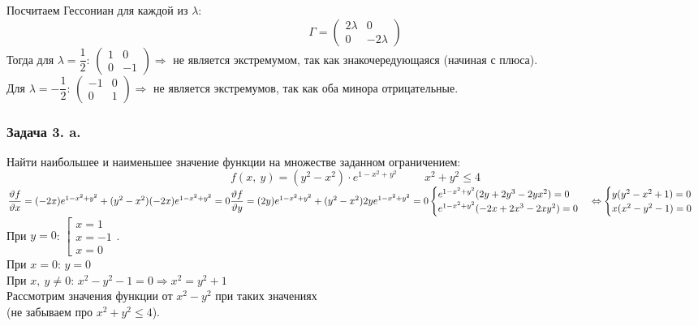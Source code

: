 \documentclass[12pt, letterpaper, twoside]{article}
\begin{document}
Посчитаем Гессониан для каждой из $\lambda$:
\[\Gamma = \begin{pmatrix}
    2\lambda & 0\\
    0 & -2\lambda
\end{pmatrix}\]
Тогда для $\lambda = \dfrac{1}{2}$: $\begin{pmatrix}
    1 & 0\\
    0 & -1
\end{pmatrix}\Rightarrow$ не является экстремумом, так как знакочередующаяся (начиная с плюса).\\
Для $\lambda = -\dfrac{1}{2}$: $\begin{pmatrix}
    -1 & 0\\
    0 & 1
\end{pmatrix}\Rightarrow$ не является экстремумов, так как оба минора отрицательные.
\subsubsection*{Задача 3. a.}
Найти наибольшее и наименьшее значение функции на множестве заданном ограничением:
\[f(x,\ y) = (y^2 - x^2)\cdot e^{1 - x^2 + y^2}\hspace{1cm} x^2 + y^2 \leq 4\]
$\dfrac{\vartheta f}{\vartheta x} = (-2x)e^{1 - x^2 + y^2} + (y^2 - x^2)(-2x)e^{1 - x^2 + y^2} = 0\\
\dfrac{\vartheta f}{\vartheta y} = (2y)e^{1 - x^2 + y^2} + (y^2 - x^2)2ye^{1 - x^2 + y^2} = 0\\
\begin{cases}
    e^{1 - x^2 + y^2}(2y + 2y^3 - 2yx^2) = 0 \\
    e^{1 - x^2 + y^2}(-2x + 2x^3 - 2xy^2) = 0
\end{cases}\Leftrightarrow\begin{cases}
    y(y^2 - x^2 + 1) = 0\\
    x(x^2 - y^2 - 1) = 0
\end{cases}$\\
При $y = 0$: $\left[\begin{gathered}
    x = 1\\
    x = -1\\
    x = 0
\end{gathered}\right.$.\\
При $x = 0$: $y = 0$\\
При $x,\ y \neq 0$:
$x^2 - y^2 - 1 = 0\Rightarrow x^2 = y^2 + 1$\\
Рассмотрим значения функции от $x^2 - y^2$ при таких значениях\\
(не забываем про $x^2 + y^2 \leq 4$).
\end{document}
